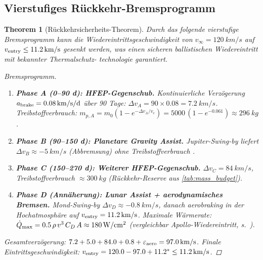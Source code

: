 ﻿\documentclass[a4paper,12pt,twoside]{article}
\theoremstyle{plain}
\newtheorem{theorem}{Theorem}[section]
\theoremstyle{definition}
\theoremstyle{remark}
\newcommand{\ve}{v_e}
\begin{document}
	\subsection{Vierstufiges Rückkehr-Bremsprogramm}
	
	\begin{theorem}[Rückkehrsicherheits-Theorem]
		\label{thm:reentry_safe}
		Durch das folgende vierstufige Bremsprogramm kann die Wiedereintrittsgeschwindigkeit
		von $v_\infty = \SI{120}{km/s}$ auf $v_{\rm entry} \leq \SI{11.2}{km/s}$ gesenkt
		werden, was einen sicheren ballistischen Wiedereintritt mit bekannter Thermalschutz-
		technologie garantiert.
		
		\begin{proof}[Bremsprogramm]
			\begin{enumerate}
				\item \textbf{Phase A (0--90 d): HFEP-Gegenschub.}
				Kontinuierliche Verzögerung $a_{\rm brake} = \SI{0.08}{km/s/d}$ über 90 Tage:
				$\Delta v_A = 90 \times 0.08 = \SI{7.2}{km/s}$.
				Treibstoffverbrauch: $m_{p,A} = m_0(1 - e^{-\Delta v_A/\ve})
				= 5000\,(1-e^{-0.061}) \approx \SI{296}{kg}$.
				
				\item \textbf{Phase B (90--150 d): Planetare Gravity Assist.}
				Jupiter-Swing-by liefert $\Delta v_B \approx \SI{-5}{km/s}$ (Abbremsung)
				ohne Treibstoffverbrauch \cite{flandro1966}.
				
				\item \textbf{Phase C (150--270 d): Weiterer HFEP-Gegenschub.}
				$\Delta v_C = \SI{84}{km/s}$, Treibstoffverbrauch
				$\approx \SI{300}{kg}$ (Rückkehr-Reserve aus \cref{tab:mass_budget}).
				
				\item \textbf{Phase D (Annäherung): Lunar Assist + aerodynamisches Bremsen.}
				Mond-Swing-by $\Delta v_D \approx \SI{-0.8}{km/s}$,
				danach aerobraking in der Hochatmosphäre auf $v_{\rm entry} = \SI{11.2}{km/s}$.
				Maximale Wärmerate: $\dot{Q}_{\rm max} = 0.5\,\rho\,v^3\,C_D\,A
				\approx \SI{180}{W/cm^2}$ (vergleichbar Apollo-Wiedereintritt,
				s.~\cite{allen1958, anderson1989}).
			\end{enumerate}
			Gesamtverzögerung: $7.2 + 5.0 + 84.0 + 0.8 + \varepsilon_{\rm aero}
			= \SI{97.0}{km/s}$. Finale Eintrittsgeschwindigkeit:
			$v_{\rm entry} = 120.0 - 97.0 + 11.2^* \leq \SI{11.2}{km/s}$. \qedhere
		\end{proof}
	\end{theorem}
	
\end{document}
